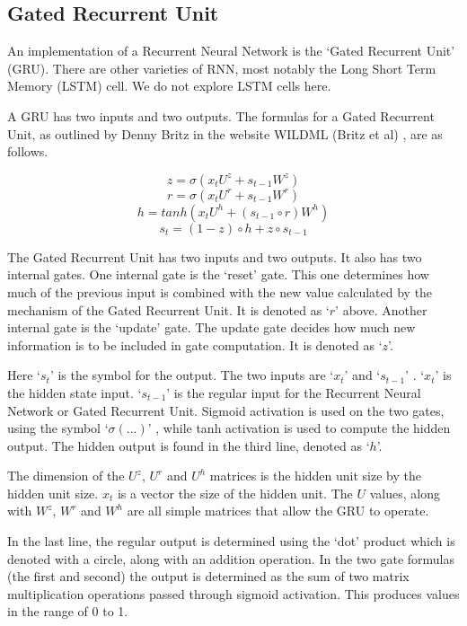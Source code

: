 \subsection{Gated Recurrent Unit}
An implementation of a Recurrent Neural Network is the `Gated Recurrent Unit' (GRU). There are other varieties of RNN, most notably the Long Short Term Memory (LSTM) cell. We do not explore \ac{LSTM} cells here.

A \ac{GRU} has two inputs and two outputs. The formulas for a Gated Recurrent Unit, as outlined by Denny Britz in the website WILDML (Britz et al) \cite{2015Britz}, are as follows.

\begin{minipage}{5in}

$$ z =\sigma(x_tU^z + s_{t-1} W^z) $$  
$$ r =\sigma(x_t U^r +s_{t-1} W^r) $$  
$$ h = tanh(x_t U^h + (s_{t-1} \circ r) W^h) $$  
$$ s_t = (1 - z) \circ h + z \circ s_{t-1} $$  

\end{minipage}

\bigskip \bigskip

The Gated Recurrent Unit has two inputs and two outputs. It also has two internal gates. One internal gate is the `reset' gate. This one determines how much of the previous input is combined with the new value calculated by the mechanism of the Gated Recurrent Unit. It is denoted as `$r$' above. Another internal gate is the `update' gate. The update gate decides how much new information is to be included in gate computation. It is denoted as `$z$'.

Here `$ s_t $' is the symbol for the output. The two inputs are `$ x_t $' and `$ s_{t-1} $' . `$ x_t $' is the hidden state input. `$ s_{t-1} $' is the regular input for the Recurrent Neural Network or Gated Recurrent Unit. Sigmoid activation is used on the two gates, using the symbol `$ \sigma(...) $' , while tanh activation is used to compute the hidden output. The hidden output is found in the third line, denoted as `$h$'.

The dimension of the $U^z$, $U^r$ and $U^h$ matrices is the hidden unit size by the hidden unit size. $ x_t $ is a vector the size of the hidden unit. The $U$ values, along with $ W^z $, $ W^r $ and $ W^h $  are all simple matrices that allow the GRU to operate.

In the last line, the regular output is determined using the `dot' product which is denoted with a circle, along with an addition operation. In the two gate formulas (the first and second) the output is determined as the sum of two matrix multiplication operations passed through sigmoid activation. This produces values in the range of 0 to 1.

